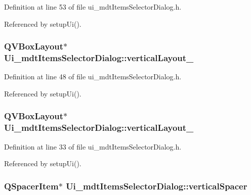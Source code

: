 Definition at line 53 of file ui\-\_\-mdt\-Items\-Selector\-Dialog.\-h.



Referenced by setup\-Ui().

\hypertarget{class_ui__mdt_items_selector_dialog_a46a693c58b8fd32e0ecc888c38276fea}{
\subsubsection[{vertical\-Layout\-\_\-3}]{\setlength{\rightskip}{0pt plus 5cm}Q\-V\-Box\-Layout$\ast$ Ui\-\_\-mdt\-Items\-Selector\-Dialog\-::vertical\-Layout\-\_}}\label{class_ui__mdt_items_selector_dialog_a46a693c58b8fd32e0ecc888c38276fea}


Definition at line 48 of file ui\-\_\-mdt\-Items\-Selector\-Dialog.\-h.



Referenced by setup\-Ui().

\hypertarget{class_ui__mdt_items_selector_dialog_a76cf24374f7a665361be0b32e97b9e03}{
\subsubsection[{vertical\-Layout\-\_\-4}]{\setlength{\rightskip}{0pt plus 5cm}Q\-V\-Box\-Layout$\ast$ Ui\-\_\-mdt\-Items\-Selector\-Dialog\-::vertical\-Layout\-\_}}\label{class_ui__mdt_items_selector_dialog_a76cf24374f7a665361be0b32e97b9e03}


Definition at line 33 of file ui\-\_\-mdt\-Items\-Selector\-Dialog.\-h.



Referenced by setup\-Ui().

\hypertarget{class_ui__mdt_items_selector_dialog_ab86448aea0bb7a3a75722aac054edcc8}{
\subsubsection[{vertical\-Spacer}]{\setlength{\rightskip}{0pt plus 5cm}Q\-Spacer\-Item$\ast$ Ui\-\_\-mdt\-Items\-Selector\-Dialog\-::vertical\-Spacer}}\label{class_ui__mdt_items_selector_dialog_ab86448aea0bb7a3a75722aac054edcc8}


